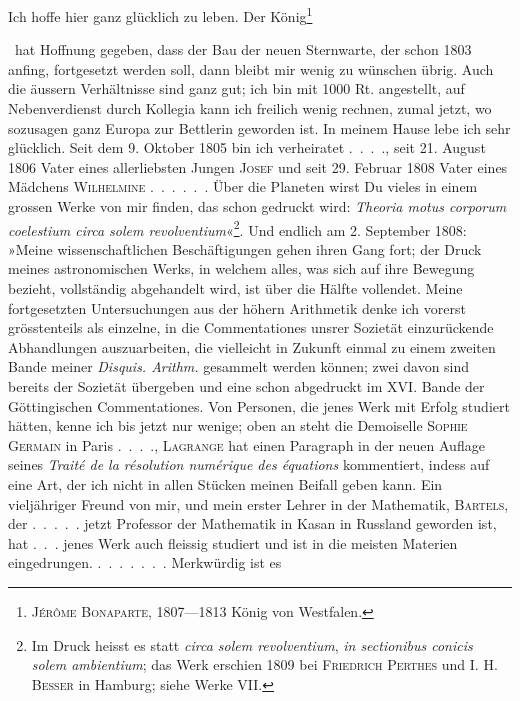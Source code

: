\clearpage{}
\noindent Ich hoffe hier ganz glücklich zu leben. Der König\begingroup\renewcommand{\thefootnote}{167a)}\footnote{\textsc{Jérôme Bonaparte}, 1807—1813 König von Westfalen.}\addtocounter{footnote}{-1}\endgroup\ hat Hoffnung gegeben,
dass der Bau der neuen Sternwarte, der schon 1803 anfing, fortgesetzt werden
soll, dann bleibt mir wenig zu wünschen übrig. Auch die äussern Verhältnisse
sind ganz gut; ich bin mit 1000 Rt. angestellt, auf Nebenverdienst
durch Kollegia kann ich freilich wenig rechnen, zumal jetzt, wo sozusagen
ganz Europa zur Bettlerin geworden ist. In meinem Hause lebe ich sehr
glücklich. Seit dem 9. Oktober 1805 bin ich verheiratet .\ .\ .\ ., seit 21. August
1806 Vater eines allerliebsten Jungen \textsc{Josef} und seit 29. Februar 1808 Vater
eines Mädchens \textsc{Wilhelmine} .\ .\ .\ .\ .\ . Über die Planeten wirst Du vieles in
einem grossen Werke von mir finden, das schon gedruckt wird: \textit{Theoria motus
corporum coelestium circa solem revolventium}«\footnote{Im Druck heisst es statt \textit{circa solem revolventium}, \textit{in sectionibus conicis solem ambientium}; das Werk erschien 1809 bei \textsc{Friedrich Perthes} und I. H. \textsc{Besser} in Hamburg; siehe Werke VII.}. Und endlich am 2. September
1808: »Meine wissenschaftlichen Beschäftigungen gehen ihren Gang fort; der
Druck meines astronomischen Werks, in welchem alles, was sich auf ihre
Bewegung bezieht, vollständig abgehandelt wird, ist über die Hälfte vollendet.
Meine fortgesetzten Untersuchungen aus der höhern Arithmetik denke ich
vorerst grösstenteils als einzelne, in die Commentationes unsrer Sozietät einzurückende
Abhandlungen auszuarbeiten, die vielleicht in Zukunft einmal zu
einem zweiten Bande meiner \textit{Disquis. Arithm.} gesammelt werden können; zwei
davon sind bereits der Sozietät übergeben und eine schon abgedruckt im
XVI. Bande der Göttingischen Commentationes. Von Personen, die jenes
Werk mit Erfolg studiert hätten, kenne ich bis jetzt nur wenige; oben an
steht die Demoiselle \textsc{Sophie Germain} in Paris .\ .\ .\ ., \textsc{Lagrange} hat einen Paragraph
in der neuen Auflage seines \textit{Traité de la résolution numérique des équations}
kommentiert, indess auf eine Art, der ich nicht in allen Stücken meinen
Beifall geben kann. Ein vieljähriger Freund von mir, und mein erster Lehrer
in der Mathematik, \textsc{Bartels}, der .\ .\ .\ .\ . jetzt Professor der Mathematik in
Kasan in Russland geworden ist, hat .\ .\ . jenes Werk auch fleissig studiert
und ist in die meisten Materien eingedrungen. .\ .\ .\ .\ .\ .\ . Merkwürdig ist es

